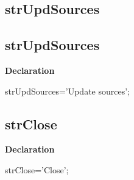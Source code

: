 \documentclass{report}
\newif\ifpdf
\begin{document}
\subsection*{\large{\textbf{strUpdSources}}\normalsize\hspace{1ex}\hrulefill}
\else
\subsection*{strUpdSources}
\fi
\label{trstrings-strUpdSources}
\begin{list}{}{
\setlength{\itemindent}{0cm}
\setlength{\listparindent}{0cm}
\setlength{\leftmargin}{\evensidemargin}
\addtolength{\leftmargin}{\tmplength}
\settowidth{\labelsep}{X}
\addtolength{\leftmargin}{\labelsep}
\setlength{\labelwidth}{\tmplength}
}
\item[\textbf{Declaration}\hfill]
\ifpdf
\begin{flushleft}
\fi
\begin{ttfamily}
strUpdSources='Update sources';\end{ttfamily}

\ifpdf
\end{flushleft}
\fi

\end{list}
\ifpdf
\subsection*{\large{\textbf{strClose}}\normalsize\hspace{1ex}\hrulefill}
\else
\subsection*{strClose}
\fi
\label{trstrings-strClose}
\begin{list}{}{
\setlength{\itemindent}{0cm}
\setlength{\listparindent}{0cm}
\setlength{\leftmargin}{\evensidemargin}
\addtolength{\leftmargin}{\tmplength}
\settowidth{\labelsep}{X}
\addtolength{\leftmargin}{\labelsep}
\setlength{\labelwidth}{\tmplength}
}
\item[\textbf{Declaration}\hfill]
\ifpdf
\begin{flushleft}
\fi
\begin{ttfamily}
strClose='Close';\end{ttfamily}

\ifpdf
\end{flushleft}
\fi

\end{list}
\ifpdf
\end{document}
